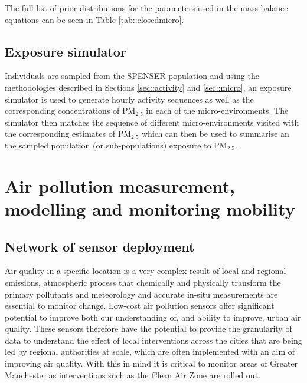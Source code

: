 \documentclass{article}
\begin{document}
\noindent The full list of prior distributions for the parameters used in the mass balance equations can be seen in Table \ref{tab::closedmicro}.

\clearpage
\subsection{Exposure simulator}


Individuals are sampled from the SPENSER population and using the methodologies described in Sections \ref{sec::activity} and \ref{sec::micro}, an exposure simulator is used to generate hourly activity sequences as well as the corresponding concentrations of PM$_{2.5}$ in each of the micro-environments. The simulator then matches the sequence of different micro-environments visited with the corresponding estimates of PM$_{2.5}$ which can then be used to summarise an the sampled population (or sub-populations) exposure to PM$_{2.5}$. 

\clearpage
\section{Air pollution measurement, modelling and monitoring mobility}\label{sec::apmandm}

\clearpage
\subsection{Network of sensor deployment}


Air quality in a specific location is a very complex result of local and regional emissions, atmospheric process that chemically and physically transform the primary pollutants and meteorology and accurate in-situ measurements are essential to monitor change. Low-cost air pollution sensors offer significant potential to improve both our understanding of, and ability to improve, urban air quality. These sensors therefore have the potential to provide the granularity of data to understand the effect of local interventions across the cities that are being led by regional authorities at scale, which are often implemented with an aim of improving air quality. With this in mind it is critical to monitor areas of Greater Manchester as interventions such as the Clean Air Zone are rolled out.  \\
\end{document}
